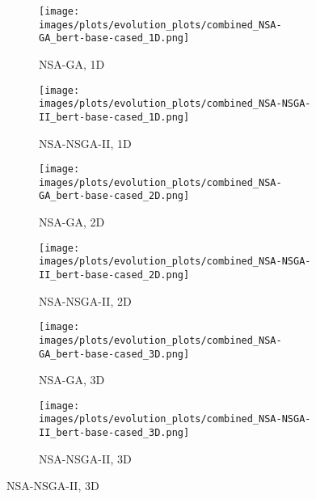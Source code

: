 
        \begin{figure}[htbp]
        \centering    \begin{subfigure}[b]{0.40\textwidth}
        \texttt{[image: images/plots/evolution\_plots/combined\_NSA-GA\_bert-base-cased\_1D.png]}
        \caption{\scriptsize NSA-GA, 1D}
        \label{subfig:bert-base-cased_NSA-GA_1D}
        \end{subfigure}\hspace{0.05\textwidth}
    \begin{subfigure}[b]{0.40\textwidth}
        \texttt{[image: images/plots/evolution\_plots/combined\_NSA-NSGA-II\_bert-base-cased\_1D.png]}
        \caption{\scriptsize NSA-NSGA-II, 1D}
        \label{subfig:bert-base-cased_NSA-NSGA-II_1D}
        \end{subfigure}

    \vspace{0.2cm}
    \begin{subfigure}[b]{0.40\textwidth}
        \texttt{[image: images/plots/evolution\_plots/combined\_NSA-GA\_bert-base-cased\_2D.png]}
        \caption{\scriptsize NSA-GA, 2D}
        \label{subfig:bert-base-cased_NSA-GA_2D}
        \end{subfigure}\hspace{0.05\textwidth}
    \begin{subfigure}[b]{0.40\textwidth}
        \texttt{[image: images/plots/evolution\_plots/combined\_NSA-NSGA-II\_bert-base-cased\_2D.png]}
        \caption{\scriptsize NSA-NSGA-II, 2D}
        \label{subfig:bert-base-cased_NSA-NSGA-II_2D}
        \end{subfigure}

    \vspace{0.2cm}
    \begin{subfigure}[b]{0.40\textwidth}
        \texttt{[image: images/plots/evolution\_plots/combined\_NSA-GA\_bert-base-cased\_3D.png]}
        \caption{\scriptsize NSA-GA, 3D}
        \label{subfig:bert-base-cased_NSA-GA_3D}
        \end{subfigure}\hspace{0.05\textwidth}
    \begin{subfigure}[b]{0.40\textwidth}
        \texttt{[image: images/plots/evolution\_plots/combined\_NSA-NSGA-II\_bert-base-cased\_3D.png]}
        \caption{\scriptsize NSA-NSGA-II, 3D}
        \label{subfig:bert-base-cased_NSA-NSGA-II_3D}
        \end{subfigure}


\end{figure}

